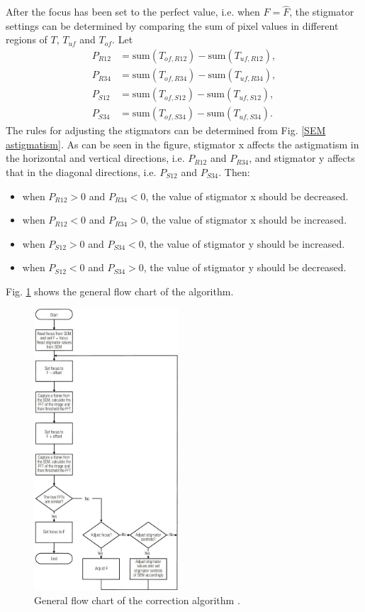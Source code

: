 \documentclass[12pt, conference]{IEEEtran}
\begin{document}
After the focus has been set to the perfect value, i.e. when $F=\hat{F}$, the stigmator settings can be determined by comparing the sum of pixel values in different regions of $T$, $T_{uf}$ and $T_{of}$. Let
\begin{align}
    P_{R12} & = \text{sum}(T_{of,R12}) - \text{sum}(T_{uf,R12}), \\
    P_{R34} & = \text{sum}(T_{of,R34}) - \text{sum}(T_{uf,R34}), \\
    P_{S12} & = \text{sum}(T_{of,S12}) - \text{sum}(T_{uf,S12}), \\
    P_{S34} & = \text{sum}(T_{of,S34}) - \text{sum}(T_{uf,S34}).
\end{align}
The rules for adjusting the stigmators can be determined from Fig. \ref{SEM astigmatism}. As can be seen in the figure, stigmator x affects the astigmatism in the horizontal and vertical directions, i.e. $P_{R12}$ and $P_{R34}$, and stigmator y affects that in the diagonal directions, i.e. $P_{S12}$ and ${P_{S34}}$. Then:
\begin{itemize}
    \item when $P_{R12}>0$ and $P_{R34}<0$, the value of stigmator x should be decreased.
    \item when $P_{R12}<0$ and $P_{R34}>0$, the value of stigmator x should be increased.
    \item when $P_{S12}>0$ and $P_{S34}<0$, the value of stigmator y should be increased.
    \item when $P_{S12}<0$ and $P_{S34}>0$, the value of stigmator y should be decreased.
\end{itemize}

Fig. \ref{Correction algorithm flowchart} shows the general flow chart of the algorithm.

\begin{figure}[htbp]
    \centering
    \includegraphics[width=0.48\textwidth]{Images/Correction algorithm flowchart.jpg}
    \caption{General flow chart of the correction algorithm \cite{SEM correction algorithm}.}
    \label{Correction algorithm flowchart}
\end{figure}
\end{document}
